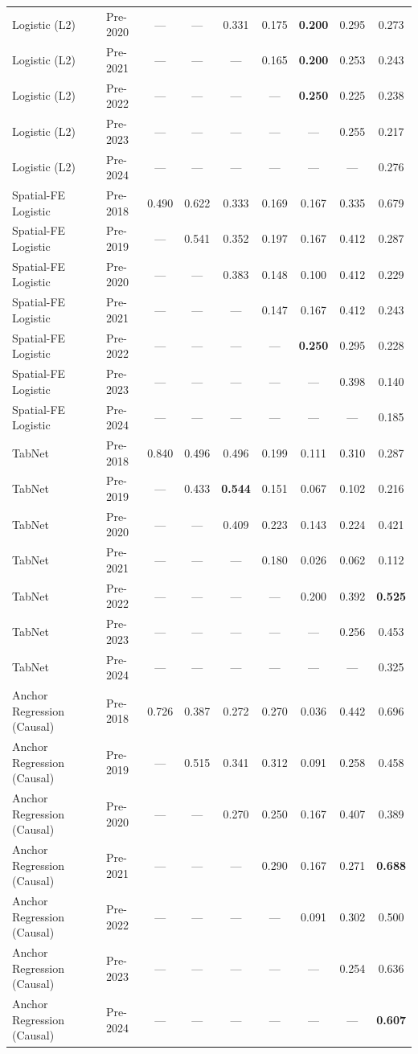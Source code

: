 \begin{table}[htbp]
{\begin{tabular}{l lccccccc}
Logistic (L2) & Pre-2020 & --- & --- & 0.331 & 0.175 & \textbf{0.200} & 0.295 & 0.273 \\
Logistic (L2) & Pre-2021 & --- & --- & --- & 0.165 & \textbf{0.200} & 0.253 & 0.243 \\
Logistic (L2) & Pre-2022 & --- & --- & --- & --- & \textbf{0.250} & 0.225 & 0.238 \\
Logistic (L2) & Pre-2023 & --- & --- & --- & --- & --- & 0.255 & 0.217 \\
Logistic (L2) & Pre-2024 & --- & --- & --- & --- & --- & --- & 0.276 \\
Spatial-FE Logistic & Pre-2018 & 0.490 & 0.622 & 0.333 & 0.169 & 0.167 & 0.335 & 0.679 \\
Spatial-FE Logistic & Pre-2019 & --- & 0.541 & 0.352 & 0.197 & 0.167 & 0.412 & 0.287 \\
Spatial-FE Logistic & Pre-2020 & --- & --- & 0.383 & 0.148 & 0.100 & 0.412 & 0.229 \\
Spatial-FE Logistic & Pre-2021 & --- & --- & --- & 0.147 & 0.167 & 0.412 & 0.243 \\
Spatial-FE Logistic & Pre-2022 & --- & --- & --- & --- & \textbf{0.250} & 0.295 & 0.228 \\
Spatial-FE Logistic & Pre-2023 & --- & --- & --- & --- & --- & 0.398 & 0.140 \\
Spatial-FE Logistic & Pre-2024 & --- & --- & --- & --- & --- & --- & 0.185 \\
TabNet & Pre-2018 & 0.840 & 0.496 & 0.496 & 0.199 & 0.111 & 0.310 & 0.287 \\
TabNet & Pre-2019 & --- & 0.433 & \textbf{0.544} & 0.151 & 0.067 & 0.102 & 0.216 \\
TabNet & Pre-2020 & --- & --- & 0.409 & 0.223 & 0.143 & 0.224 & 0.421 \\
TabNet & Pre-2021 & --- & --- & --- & 0.180 & 0.026 & 0.062 & 0.112 \\
TabNet & Pre-2022 & --- & --- & --- & --- & 0.200 & 0.392 & \textbf{0.525} \\
TabNet & Pre-2023 & --- & --- & --- & --- & --- & 0.256 & 0.453 \\
TabNet & Pre-2024 & --- & --- & --- & --- & --- & --- & 0.325 \\
Anchor Regression (Causal) & Pre-2018 & 0.726 & 0.387 & 0.272 & 0.270 & 0.036 & 0.442 & 0.696 \\
Anchor Regression (Causal) & Pre-2019 & --- & 0.515 & 0.341 & 0.312 & 0.091 & 0.258 & 0.458 \\
Anchor Regression (Causal) & Pre-2020 & --- & --- & 0.270 & 0.250 & 0.167 & 0.407 & 0.389 \\
Anchor Regression (Causal) & Pre-2021 & --- & --- & --- & 0.290 & 0.167 & 0.271 & \textbf{0.688} \\
Anchor Regression (Causal) & Pre-2022 & --- & --- & --- & --- & 0.091 & 0.302 & 0.500 \\
Anchor Regression (Causal) & Pre-2023 & --- & --- & --- & --- & --- & 0.254 & 0.636 \\
Anchor Regression (Causal) & Pre-2024 & --- & --- & --- & --- & --- & --- & \textbf{0.607} \\
\bottomrule
\end{tabular}%
}
\end{table}